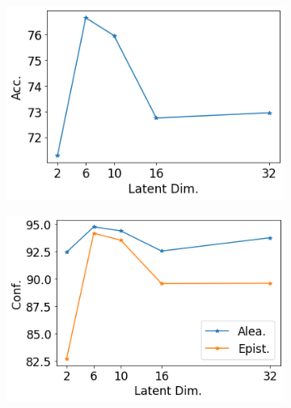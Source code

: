 \begin{figure}[ht]
    \centering
    \begin{subfigure}[t]{0.33 \textwidth}
        \centering
        \includegraphics[width=1. \textwidth]{sections/006_neurips2020/figures/lat_dim_cifar10_acc.png}
    \end{subfigure}%
    \begin{subfigure}[t]{0.33 \textwidth}
        \centering
        \includegraphics[width=1. \textwidth]{sections/006_neurips2020/figures/lat_dim_cifar10_conf.png}
    \end{subfigure}%
    \begin{subfigure}[t]{0.33 \textwidth}
        \centering

\end{subfigure}
\end{figure}
